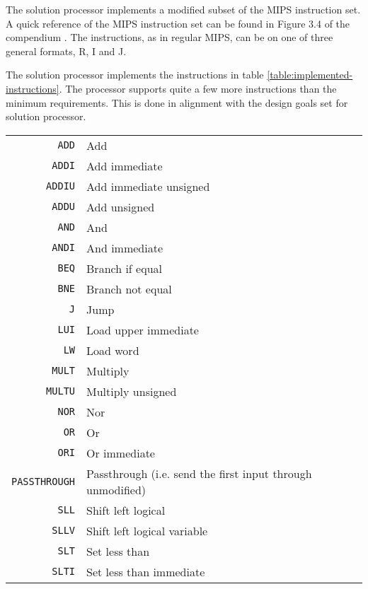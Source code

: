 The solution processor implements a modified subset of the MIPS instruction set.
A quick reference of the MIPS instruction set can be found in Figure 3.4 of the compendium \cite{compendium}.
The instructions, as in regular MIPS, can be on one of three general formats, R, I and J.

The solution processor implements the instructions in table \vref{table:implemented-instructions}.
The processor supports quite a few more instructions than the minimum requirements.
This is done in alignment with the design goals set for solution processor.

\begin{table}[h]
    \begin{center}
        \begin{tabular}{r|l}
            \texttt{ADD} & Add \\
            \texttt{ADDI} & Add immediate \\
            \texttt{ADDIU} & Add immediate unsigned \\
            \texttt{ADDU} & Add unsigned \\
            \texttt{AND} & And \\
            \texttt{ANDI} & And immediate \\
            \texttt{BEQ} & Branch if equal \\
            \texttt{BNE} & Branch not equal \\
            \texttt{J} & Jump \\
            \texttt{LUI} & Load upper immediate \\
            \texttt{LW} & Load word \\
            \texttt{MULT} & Multiply \\
            \texttt{MULTU} & Multiply unsigned \\
            \texttt{NOR} & Nor \\
            \texttt{OR} & Or \\
            \texttt{ORI} & Or immediate \\
            \texttt{PASSTHROUGH} & Passthrough (i.e. send the first input through unmodified) \\
            \texttt{SLL} & Shift left logical \\
            \texttt{SLLV} & Shift left logical variable \\
            \texttt{SLT} & Set less than \\
            \texttt{SLTI} & Set less than immediate \\

\end{tabular}
\end{center}
\end{table}
